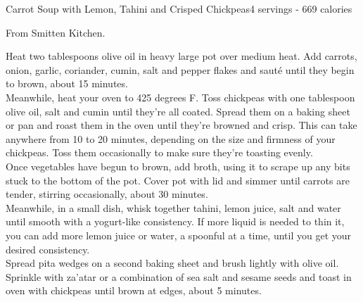 \begin{recipe}{Carrot Soup with Lemon, Tahini and Crisped Chickpeas}{4 servings - 669 calories}{}

\freeform From Smitten Kitchen.\\


Heat two tablespoons olive oil in heavy large pot over medium heat. Add carrots, onion, garlic, coriander, cumin, salt and pepper flakes and sauté until they begin to brown, about 15 minutes.\\

Meanwhile, heat your oven to 425 degrees F. Toss chickpeas with one tablespoon olive oil, salt and cumin until they’re all coated. Spread them on a baking sheet or pan and roast them in the oven until they’re browned and crisp. This can take anywhere from 10 to 20 minutes, depending on the size and firmness of your chickpeas. Toss them occasionally to make sure they’re toasting evenly.\\

Once vegetables have begun to brown, add broth, using it to scrape up any bits stuck to the bottom of the pot. Cover pot with lid and simmer until carrots are tender, stirring occasionally, about 30 minutes.\\

Meanwhile, in a small dish, whisk together tahini, lemon juice, salt and water until smooth with a yogurt-like consistency. If more liquid is needed to thin it, you can add more lemon juice or water, a spoonful at a time, until you get your desired consistency.\\

Spread pita wedges on a second baking sheet and brush lightly with olive oil. Sprinkle with za’atar or a combination of sea salt and sesame seeds and toast in oven with chickpeas until brown at edges, about 5 minutes.


\end{recipe}
